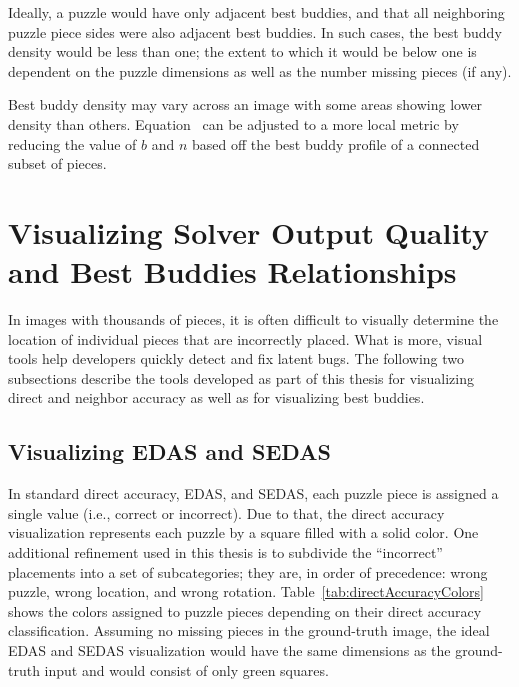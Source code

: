 Ideally, a puzzle would have only adjacent best buddies, and that all neighboring puzzle piece sides were also adjacent best buddies.  In such cases, the best buddy density would be less than one; the extent to which it would be below one is dependent on the puzzle dimensions as well as the number missing pieces (if any). 

Best buddy density may vary across an image with some areas showing lower density than others. Equation~ can be adjusted to a more local metric by reducing the value of $b$ and $n$ based off the best buddy profile of a connected subset of pieces.

\section{Visualizing Solver Output Quality and Best Buddies Relationships}\label{sec:visualizingSolverAccuracy}

In images with thousands of pieces, it is often difficult to visually determine the location of individual pieces that are incorrectly placed.  What is more, visual tools help developers quickly detect and fix latent bugs.  The following two subsections describe the tools developed as part of this thesis for visualizing direct and neighbor accuracy as well as for visualizing best buddies.

\subsection{Visualizing EDAS and SEDAS}\label{sec:visualizingEdasSedas}

In standard direct accuracy, EDAS, and SEDAS, each puzzle piece is assigned a single value (i.e., correct or incorrect).  Due to that, the direct accuracy visualization represents each puzzle by a square filled with a solid color.  One additional refinement used in this thesis is to subdivide the ``incorrect'' placements into a set of subcategories; they are, in order of precedence: wrong puzzle, wrong location, and wrong rotation.  Table~\ref{tab:directAccuracyColors} shows the colors assigned to puzzle pieces depending on their direct accuracy classification.  Assuming no missing pieces in the ground-truth image, the ideal EDAS and SEDAS visualization would have the same dimensions as the ground-truth input and would consist of only green squares.

